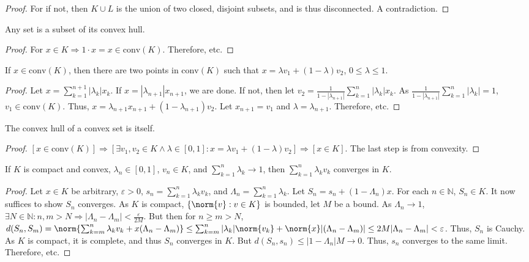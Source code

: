 \documentclass[crop=false,class=book,oneside]{standalone}
\begin{document}
            \begin{proof}
            For if not, then $K\cup L$ is the union of two closed, disjoint subsets, and is thus disconnected. A contradiction. 
            \end{proof}
            \begin{lemma}
            Any set is a subset of its convex hull.
            \end{lemma}
            \begin{proof}
            For $x\in K \Rightarrow 1\cdot x=x \in \textrm{conv}(K)$. Therefore, etc.
            \end{proof}
            \begin{lemma}
            If $x\in \textrm{conv}(K)$, then there are two points in $\textrm{conv}(K)$ such that $x = \lambda v_1 +(1- \lambda) v_2$, $0 \leq \lambda \leq 1$.
            \end{lemma}
            \begin{proof}
            Let $x=\sum_{k=1}^{n+1}|\lambda_k| x_k$. If $x=|\lambda_{n+1}|x_{n+1}$, we are done. If not, then let $v_2 = \frac{1}{1-|\lambda_{n+1}|}\sum_{k=1}^{n}|\lambda_k|x_k$. As $\frac{1}{1-|\lambda_{n+1}|}\sum_{k=1}^{n}|\lambda_k| = 1$, $v_1\in \textrm{conv}(K)$. Thus, $x = \lambda_{n+1}x_{n+1}+(1-\lambda_{n+1})v_2$. Let $x_{n+1}=v_1$ and $\lambda = \lambda_{n+1}$. Therefore, etc.
            \end{proof}
            \begin{theorem}
            The convex hull of a convex set is itself.
            \end{theorem}
            \begin{proof}
            $[x\in \textrm{conv}(K)]\Rightarrow [\exists v_1,v_2\in K\land \lambda\in[0,1]:x=\lambda v_1+(1-\lambda)v_2]\Rightarrow [x\in K]$. The last step is from convexity.
            \end{proof}
            \begin{theorem}
            If $K$ is compact and convex, $\lambda_n\in[0,1]$, $v_n\in K$, and $\sum_{k=1}^{n}\lambda_k \rightarrow 1$, then $\sum_{k=1}^{n}\lambda_k v_k$ converges in $K$.
            \end{theorem}
            \begin{proof}
            Let $x\in K$ be arbitrary, $\varepsilon>0$, $s_n = \sum_{k=1}^{n}\lambda_k v_k$, and $\Lambda_n = \sum_{k=1}^{n}\lambda_k$. Let $S_n = s_n + (1-\Lambda_n)x$. For each $n\in \mathbb{N}$, $S_n\in K$. It now suffices to show $S_n$ converges. As $K$ is compact, $\{\norm{v}:v\in K\}$ is bounded, let $M$ be a bound. As $\Lambda_n\rightarrow 1$, $\exists N\in \mathbb{N}:n,m>N\Rightarrow |\Lambda_n-\Lambda_m|<\frac{\varepsilon}{2M}$. But then for $n\geq m >N$, $d(S_n,S_m) = \norm{\sum_{k=m}^{n}\lambda_k v_k+x(\Lambda_n-\Lambda_m)} \leq \sum_{k=m}^{n}|\lambda_k| \norm{v_k}+\norm{x}|(\Lambda_n-\Lambda_m)|\leq 2M|\Lambda_{n}-\Lambda_{m}|<\varepsilon$. Thus, $S_n$ is Cauchy. As $K$ is compact, it is complete, and thus $S_n$ converges in $K$. But $d(S_n,s_n)\leq |1-\Lambda_n|M\rightarrow 0$. Thus, $s_n$ converges to the same limit. Therefore, etc.
            \end{proof}
\end{document}
